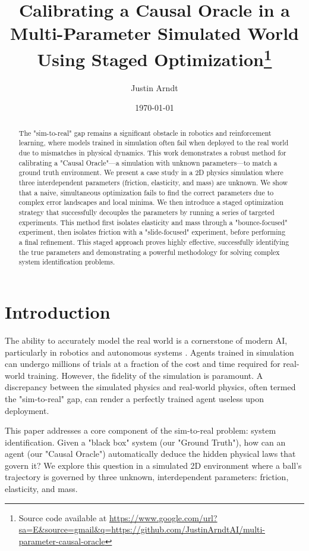 \documentclass{article}
\title{Calibrating a Causal Oracle in a Multi-Parameter Simulated World Using Staged Optimization\thanks{Source code available at \url{https://www.google.com/url?sa=E&source=gmail&q=https://github.com/JustinArndtAI/multi-parameter-causal-oracle}}}
\author[1]{Justin Arndt}
\affil[1]{Independent Researcher}
\date{\today}
\begin{document}
\maketitle

\begin{abstract}
The "sim-to-real" gap remains a significant obstacle in robotics and reinforcement learning, where models trained in simulation often fail when deployed to the real world due to mismatches in physical dynamics. This work demonstrates a robust method for calibrating a "Causal Oracle"—a simulation with unknown parameters—to match a ground truth environment. We present a case study in a 2D physics simulation where three interdependent parameters (friction, elasticity, and mass) are unknown. We show that a naive, simultaneous optimization fails to find the correct parameters due to complex error landscapes and local minima. We then introduce a staged optimization strategy that successfully decouples the parameters by running a series of targeted experiments. This method first isolates elasticity and mass through a "bounce-focused" experiment, then isolates friction with a "slide-focused" experiment, before performing a final refinement. This staged approach proves highly effective, successfully identifying the true parameters and demonstrating a powerful methodology for solving complex system identification problems.
\end{abstract}

\section{Introduction}

The ability to accurately model the real world is a cornerstone of modern AI, particularly in robotics and autonomous systems \cite{chebotar2019}. Agents trained in simulation can undergo millions of trials at a fraction of the cost and time required for real-world training. However, the fidelity of the simulation is paramount. A discrepancy between the simulated physics and real-world physics, often termed the "sim-to-real" gap, can render a perfectly trained agent useless upon deployment.

This paper addresses a core component of the sim-to-real problem: system identification. Given a "black box" system (our "Ground Truth"), how can an agent (our "Causal Oracle") automatically deduce the hidden physical laws that govern it? We explore this question in a simulated 2D environment where a ball's trajectory is governed by three unknown, interdependent parameters: friction, elasticity, and mass.
\end{document}
